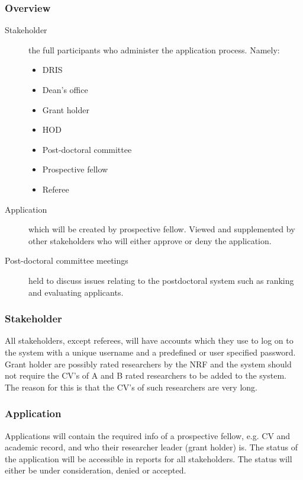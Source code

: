 \documentclass[12pt]{article}
\begin{document}
		\subsubsection{Overview}
		\begin{description}
			\item[Stakeholder] the full participants who administer the application process. Namely: 
				\begin{itemize}
					\item DRIS
					\item Dean's office
					\item Grant holder
					\item HOD
					\item Post-doctoral committee
					\item Prospective fellow
					\item Referee
				\end{itemize}
			\item[Application] which will be created by prospective fellow. Viewed and supplemented by other stakeholders who will either approve or deny the application.
			\item[Post-doctoral committee meetings] held to discuss issues relating to the postdoctoral system such as ranking and evaluating applicants.
		\end{description}
		\vspace{0.5in}
		\subsubsection{Stakeholder}
		All stakeholders, except referees, will have accounts which they use to log on to the system with a unique username and a predefined or user specified password.\linebreak \linebreak
		Grant holder are possibly rated researchers by the NRF and the system should not require the CV's of A and B rated researchers to be added to the system. The reason for this is that the CV's of such researchers are very long.
		\subsubsection{Application}
		Applications will contain the required info of a prospective fellow, e.g. CV and academic record, and who their researcher leader (grant holder) is. The status of the application will be accessible in reports for all stakeholders. The status will either be under consideration, denied or accepted.
\end{document}

